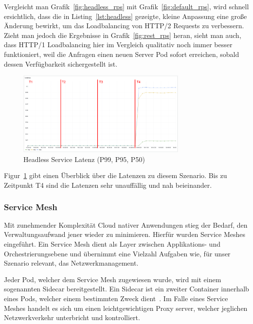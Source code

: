Vergleicht man Grafik~\ref{fig:headless_rps} mit Grafik~\ref{fig:default_rps}, wird schnell ersichtlich, dass die in Listing~\ref{lst:headless} gezeigte, kleine Anpassung eine große Änderung bewirkt, um das Loadbalancing von HTTP/2 Requests zu verbessern.
Zieht man jedoch die Ergebnisse in Grafik~\ref{fig:rest_rps} heran, sieht man auch, dass HTTP/1 Loadbalancing hier im Vergleich qualitativ noch immer besser funktioniert, weil die Anfragen einen neuen Server Pod sofort erreichen, sobald dessen Verfügbarkeit sichergestellt ist.

\begin{figure}[H]
    \centering
    \includegraphics[width=0.75\textwidth]{img/headless_latenz}
    \caption{Headless Service Latenz (P99, P95, P50)}
    \label{fig:headless_latenz}
\end{figure}

Figur~\ref{fig:headless_latenz} gibt einen Überblick über die Latenzen zu diesem Szenario.
Bis zu Zeitpunkt T4 sind die Latenzen sehr unauffällig und nah beieinander.

\subsubsection{Service Mesh}\label{subsubsec:mesh}

Mit zunehmender Komplexität Cloud nativer Anwendungen stieg der Bedarf, den Verwaltungsaufwand jener wieder zu minimieren.
Hierfür wurden Service Meshes eingeführt.
Ein Service Mesh dient als Layer zwischen Applikations- und Orchestrierungsebene und übernimmt eine Vielzahl Aufgaben wie, für unser Szenario relevant, das Netzwerkmanagement.

Jeder Pod, welcher dem Service Mesh zugewiesen wurde, wird mit einem sogenannten Sidecar bereitgestellt.
Ein Sidecar ist ein zweiter Container innerhalb eines Pods, welcher einem bestimmten Zweck dient~\cite{koschel2021look}.
Im Falle eines Service Meshes handelt es sich um einen leichtgewichtigen Proxy server, welcher jeglichen Netzwerkverkehr unterbricht und kontrolliert.

